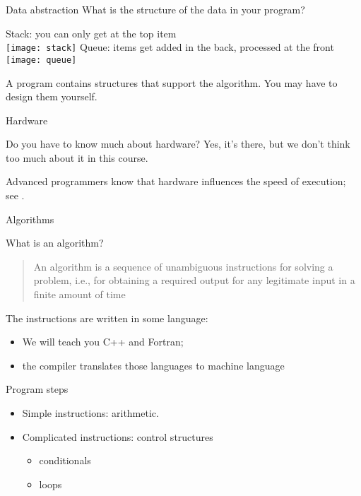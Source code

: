 \begin{block}{Data abstraction}
  \label{sl:stackabstract}
  What is the structure of the data in your program?

  \begin{multicols}{2}
    Stack: you can only get at the top item\\

    \texttt{[image: stack]}
    \vfill\columnbreak
    Queue: items get added in the back, processed at the front\\

    \texttt{[image: queue]}
  \end{multicols}
  A program contains structures that support the algorithm. You may
  have to design them yourself.
\end{block}

 {Hardware}

\begin{block}{Do you have to know much about hardware?}
  \label{sl:hardwarevid}
  Yes, it's there, but we don't think too much about it in this course.

  Advanced programmers know that hardware influences the speed of
  execution; see .
\end{block}

 {Algorithms}

\begin{block}{What is an algorithm?}
  \label{sl:whatalgo}
  \begin{quotation}
    \raggedright\noindent
    An algorithm is a sequence of unambiguous instructions for solving
    a problem, i.e., for obtaining a required output for any
    legitimate input in a finite amount of time\\
  \end{quotation}
  The instructions are written in some language:
  \begin{itemize}
  \item We will teach you C++ and Fortran;
  \item the compiler translates those languages to machine language
  \end{itemize}
\end{block}

\begin{block}{Program steps}
  \label{sl:step-by-step}
  \begin{itemize}
  \item Simple instructions: arithmetic.
  \item Complicated instructions: control structures
    \begin{itemize}
    \item conditionals
    \item loops
    \end{itemize}
  \end{itemize}
\end{block}

